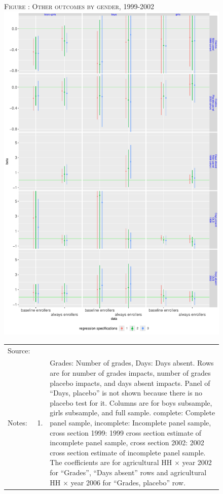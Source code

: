\documentclass[12pt,letterpaper]{article}
\newcommand{\0}{\ensuremath{\mbox{\boldmath $0$}}}
\begin{document}
{\begin{figure}
\hfil\textsc{\footnotesize Figure \thefigure: Other outcomes by gender, 1999-2002\label{NumGradesDaysAbsentPlots}}\\
\hfil \includegraphics[width=.7\paperwidth]{Figures/App_NumGradesDaysAbsentPlotsByGender.pdf}\\
\renewcommand{\arraystretch}{1}
\hfil\begin{tabular}{>{\hfill\scriptsize}p{1cm}<{}>{\hfill\scriptsize}p{.5cm}<{}>{\scriptsize}p{11cm}<{\hfill}}
Source: & \multicolumn{2}{l}{\scriptsize Compiled from IFPRI data.} \\[-1ex]
Notes:& 1. & Grades: Number of grades, Days: Days absent. Rows are for number of grades impacts, number of grades placebo impacts, and days absent impacts.  Panel of ``Days, placebo'' is not shown because there is no placebo test for it. Columns are for boys subsample, girls subsample, and full sample. \textsf{complete}: Complete panel sample, \textsf{incomplete}: Incomplete panel sample, \textsf{cross section 1999}: 1999 cross section estimate of incomplete panel sample, \textsf{cross section 2002}: 2002 cross section estimate of incomplete panel sample. The coefficients are for agricultural HH $\times$ year 2002 for ``Grades'', ``Days absent'' rows and agricultural HH $\times$ year 2006 for ``Grades, placebo'' row.\\[-1ex]

\end{tabular}
\end{figure}}
\end{document}
